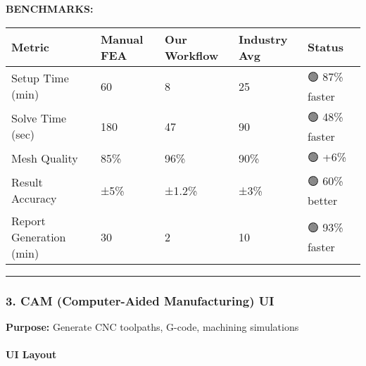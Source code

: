 \documentclass[
]{article}
\begin{document}
\textbf{BENCHMARKS:}

\begin{longtable}[]{@{}lllll@{}}
\toprule\noalign{}
Metric & Manual FEA & Our Workflow & Industry Avg & Status \\
\midrule\noalign{}
\endhead
\bottomrule\noalign{}
\endlastfoot
Setup Time (min) & 60 & 8 & 25 & 🟢 87\% faster \\
Solve Time (sec) & 180 & 47 & 90 & 🟢 48\% faster \\
Mesh Quality & 85\% & 96\% & 90\% & 🟢 +6\% \\
Result Accuracy & ±5\% & ±1.2\% & ±3\% & 🟢 60\% better \\
Report Generation (min) & 30 & 2 & 10 & 🟢 93\% faster \\
\end{longtable}

\begin{center}\rule{0.5\linewidth}{0.5pt}\end{center}

\hypertarget{cam-computer-aided-manufacturing-ui}{%
\subsubsection{3. CAM (Computer-Aided Manufacturing)
UI}\label{cam-computer-aided-manufacturing-ui}}

\textbf{Purpose:} Generate CNC toolpaths, G-code, machining simulations

\hypertarget{ui-layout-1}{%
\paragraph{UI Layout}\label{ui-layout-1}}
\end{document}
